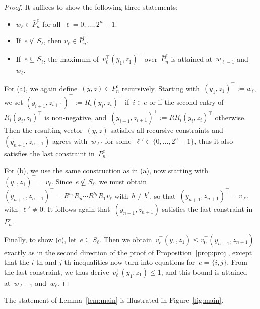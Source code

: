 \documentclass{article}
\begin{document}
\begin{proof}
  It suffices to show the following three statements:
  \begin{itemize}
  \item[(a)] $w_\ell\in\bar P^e_n$ for all~$\ell=0,\dots,2^n-1$.
  \item[(b)] If~$e\not\subseteq S_\ell$, then $v_\ell\in \bar P^e_n$.
  \item[(c)] If~$e\subseteq S_\ell$, the maximum of~$v_\ell^\top
    (y_1,z_1)^\top$ over~$\bar P_n^e$ is attained at~$w_{\ell-1}$
    and~$w_{\ell}$.
  \end{itemize}
  For (a), we again define~$(y,z)\in P_n^e$ recursively. Starting
  with~$(y_1,z_1)^\top:=w_\ell$, we set
  $(y_{i+1},z_{i+1})^\top:=R_i(y_i,z_i)^\top$ if~$i\in e$ or if the
  second entry of~$R_i(y_i,z_i)^\top$ is non-negative,
  and~$(y_{i+1},z_{i+1})^\top:=RR_i(y_i,z_i)^\top$ otherwise. Then the
  resulting vector~$(y,z)$ satisfies all recursive constraints
  and~$(y_{n+1},z_{n+1})$ agrees with~$w_{\ell'}$ for
  some~$\ell'\in\{0,\dots,2^n-1\}$, thus it also satisfies the last
  constraint in~$P_n^e$.

  For (b), we use the same construction as in (a), now starting
  with~$(y_1,z_1)^\top=v_\ell$. Since~$e\not\subseteq S_\ell$, we must
  obtain~$(y_{n+1},z_{n+1})^\top=R^{b_n}R_n\cdots R^{b_1}R_1v_\ell$
  with~$b\neq b^\ell$, so that~$(y_{n+1},z_{n+1})^\top=v_{\ell'}$
  with~$\ell'\neq 0$. It follows again that~$(y_{n+1},z_{n+1})$
  satisfies the last constraint in~$P_n^e$.

  Finally, to show (c), let~$e\subseteq S_\ell$. Then we
  obtain~$v_\ell^\top(y_1,z_1)\le v_0^\top(y_{n+1},z_{n+1})$ exactly
  as in the second direction of the proof of
  Proposition~\ref{prop:proj}, except that the $i$-th and $j$-th
  inequalities now turn into equations for~$e=\{i,j\}$. From the last
  constraint, we thus derive~$v_\ell^\top(y_1,z_1)\le 1$, and this
  bound is attained at~$w_{\ell-1}$ and~$w_\ell$.
\end{proof}
\noindent The statement of Lemma~\ref{lem:main} is illustrated in
Figure~\ref{fig:main}.
\end{document}
